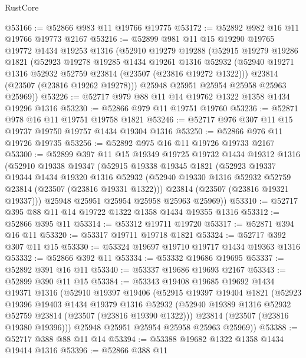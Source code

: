\begin{lexlean}{RustCore}
\begin{coremodule}
@53166 := @52866 @983 @11 @19766 @19775
@53172 := @52892 @982 @16 @11 @19766 @19773 @2167
@53216 := @52899
    @981
    @11
    @15
    @19290
    @19765
    @19772
    @1434
    @19253
    @1316
    (@52910
      @19279
      @19288
      (@52915
        @19279
        @19286
        @1821
        (@52923
          @19278
          @19285
          @1434
          @19261
          @1316
          @52932
          (@52940 @19271 @1316 @52932 @52759 @23814 (@23507 (@23816 @19272 @1322)))
          @23814
          (@23507 (@23816 @19262 @19278)))
        @25948
        @25951
        @25954
        @25958
        @25963
        @25969))
@53226 := @52717 @979 @88 @11 @14 @19762 @1322 @1358 @1434 @19296 @1316
@53230 := @52866 @979 @11 @19751 @19760
@53236 := @52871 @978 @16 @11 @19751 @19758 @1821
@53246 := @52717 @976 @307 @11 @15 @19737 @19750 @19757 @1434 @19304 @1316
@53250 := @52866 @976 @11 @19726 @19735
@53256 := @52892 @975 @16 @11 @19726 @19733 @2167
@53300 := @52899
    @397
    @11
    @15
    @19349
    @19725
    @19732
    @1434
    @19312
    @1316
    (@52910
      @19338
      @19347
      (@52915
        @19338
        @19345
        @1821
        (@52923
          @19337
          @19344
          @1434
          @19320
          @1316
          @52932
          (@52940 @19330 @1316 @52932 @52759 @23814 (@23507 (@23816 @19331 @1322)))
          @23814
          (@23507 (@23816 @19321 @19337)))
        @25948
        @25951
        @25954
        @25958
        @25963
        @25969))
@53310 := @52717 @395 @88 @11 @14 @19722 @1322 @1358 @1434 @19355 @1316
@53312 := @52866 @395 @11
@53314 := @53312 @19711 @19720
@53317 := @52871 @394 @16 @11
@53320 := @53317 @19711 @19718 @1821
@53324 := @52717 @392 @307 @11 @15
@53330 := @53324 @19697 @19710 @19717 @1434 @19363 @1316
@53332 := @52866 @392 @11
@53334 := @53332 @19686 @19695
@53337 := @52892 @391 @16 @11
@53340 := @53337 @19686 @19693 @2167
@53343 := @52899 @390 @11 @15
@53384 := @53343
    @19408
    @19685
    @19692
    @1434
    @19371
    @1316
    (@52910
      @19397
      @19406
      (@52915
        @19397
        @19404
        @1821
        (@52923
          @19396
          @19403
          @1434
          @19379
          @1316
          @52932
          (@52940 @19389 @1316 @52932 @52759 @23814 (@23507 (@23816 @19390 @1322)))
          @23814
          (@23507 (@23816 @19380 @19396)))
        @25948
        @25951
        @25954
        @25958
        @25963
        @25969))
@53388 := @52717 @388 @88 @11 @14
@53394 := @53388 @19682 @1322 @1358 @1434 @19414 @1316
@53396 := @52866 @388 @11

\end{coremodule}
\end{lexlean}
